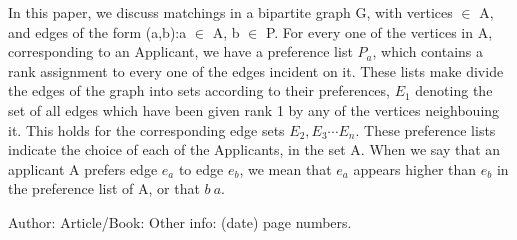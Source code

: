 \documentclass{llncs}
\begin{document}
In this paper, we discuss  matchings in a bipartite graph G, with vertices $\in$ A\cupP, and edges of the form (a,b):\lbrace a $\in$ A, b $\in$ P\rbrace. For every one of the vertices in A, corresponding to an Applicant, we have a preference list $P_a$, which contains a rank assignment to every one of the edges incident on it. These lists make divide the edges of the graph into sets according to their preferences, $E_1$ denoting the set of all edges which have been given rank 1 by any of the vertices neighbouing it. This holds for the corresponding edge sets $E_2, E_3 \cdots E_n$. These preference lists indicate the choice of each of the Applicants, in the set A. When we say that an applicant A prefers edge $e_a$ to edge $e_b$, we mean that $e_a$ appears higher than $e_b$  in the preference list of A, or that $b \> a$.  





























%
%

\begin{thebibliography}{1}
Author:
Article/Book:
Other info: (date) page numbers.
\end{thebibliography}
\end{document}
